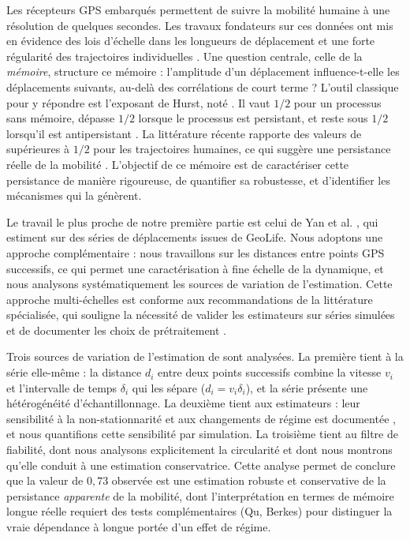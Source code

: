Les récepteurs GPS embarqués permettent de suivre la mobilité humaine à une résolution de quelques secondes. Les travaux fondateurs sur ces données ont mis en évidence des lois d'échelle dans les longueurs de déplacement et une forte régularité des trajectoires individuelles \cite{brockmann2006,gonzalez2008,song2010}. Une question centrale, celle de la \emph{mémoire}, structure ce mémoire : l'amplitude d'un déplacement influence-t-elle les déplacements suivants, au-delà des corrélations de court terme ? L'outil classique pour y répondre est l'exposant de Hurst, noté \Hurst. Il vaut $1/2$ pour un processus sans mémoire, dépasse $1/2$ lorsque le processus est persistant, et reste sous $1/2$ lorsqu'il est antipersistant \cite{hurst1951}. La littérature récente rapporte des valeurs de \Hurst{} supérieures à $1/2$ pour les trajectoires humaines, ce qui suggère une persistance réelle de la mobilité \cite{yan2013}. L'objectif de ce mémoire est de caractériser cette persistance de manière rigoureuse, de quantifier sa robustesse, et d'identifier les mécanismes qui la génèrent.

Le travail le plus proche de notre première partie est celui de Yan et al. \cite{yan2013}, qui estiment \Hurst{} sur des séries de déplacements issues de GeoLife. Nous adoptons une approche complémentaire : nous travaillons sur les distances entre points GPS successifs, ce qui permet une caractérisation à fine échelle de la dynamique, et nous analysons systématiquement les sources de variation de l'estimation. Cette approche multi-échelles est conforme aux recommandations de la littérature spécialisée, qui souligne la nécessité de valider les estimateurs sur séries simulées et de documenter les choix de prétraitement \cite{taqqu1995,maraun2004}.

Trois sources de variation de l'estimation de \Hurst{} sont analysées. La première tient à la série elle-même : la distance $d_i$ entre deux points successifs combine la vitesse $v_i$ et l'intervalle de temps $\delta_i$ qui les sépare ($d_i = v_i \delta_i$), et la série présente une hétérogénéité d'échantillonnage. La deuxième tient aux estimateurs : leur sensibilité à la non-stationnarité et aux changements de régime est documentée \cite{klemes1974}, et nous quantifions cette sensibilité par simulation. La troisième tient au filtre de fiabilité, dont nous analysons explicitement la circularité et dont nous montrons qu'elle conduit à une estimation conservatrice. Cette analyse permet de conclure que la valeur de $0{,}73$ observée est une estimation robuste et conservative de la persistance \emph{apparente} de la mobilité, dont l'interprétation en termes de mémoire longue réelle requiert des tests complémentaires (Qu, Berkes) pour distinguer la vraie dépendance à longue portée d'un effet de régime.

